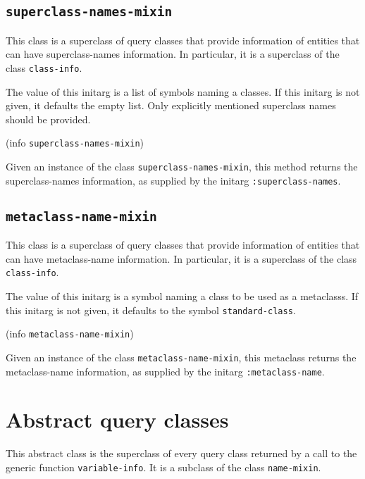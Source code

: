 \subsection{\texttt{superclass-names-mixin}}

This class is a superclass of query classes that provide information
of entities that can have superclass-names information.  In
particular, it is a superclass of the class \texttt{class-info}.


The value of this initarg is a list of symbols naming a classes.  If
this initarg is not given, it defaults the empty list.  Only
explicitly mentioned superclass names should be provided.

 {(info {\tt superclass-names-mixin})}

Given an instance of the class \texttt{superclass-names-mixin}, this
method returns the superclass-names information, as supplied by the
initarg \texttt{:superclass-names}.

\subsection{\texttt{metaclass-name-mixin}}

This class is a superclass of query classes that provide information
of entities that can have metaclass-name information.  In
particular, it is a superclass of the class
\texttt{class-info}.


The value of this initarg is a symbol naming a class to be used as a
metaclasss.  If this initarg is not given, it defaults to the symbol
\texttt{standard-class}.

 {(info {\tt metaclass-name-mixin})}

Given an instance of the class \texttt{metaclass-name-mixin}, this
metaclass returns the metaclass-name information, as supplied by the
initarg \texttt{:metaclass-name}.

\section{Abstract query classes}


This abstract class is the superclass of every query class returned by
a call to the generic function \texttt{variable-info}.  It is a
subclass of the class \texttt{name-mixin}.

